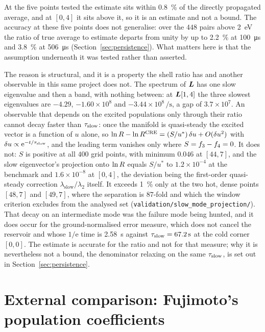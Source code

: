 At the five points tested the estimate sits within \SI{0.8}{\percent} of the
directly propagated average, and at $[0,4]$ it sits above it, so it is an
estimate and not a bound. The accuracy at these five points does not
generalise: over the $448$ pairs above \SI{2}{\electronvolt} the ratio of true
average to estimate departs from unity by up to \SI{2.2}{\percent} at
\SI{100}{\micro\second} and \SI{3.8}{\percent} at \SI{506}{\micro\second}
(Section~\ref{sec:persistence}). What matters here is that the assumption
underneath it was tested rather than asserted.

The reason is structural, and it is a property the shell ratio has and another
observable in this same project does not. The spectrum of $\bm{L}$ has one slow
eigenvalue and then a band, with nothing between: at $\bm{L}[1,4]$ the three
slowest eigenvalues are $-4.29$, $-1.60\times10^{8}$ and
$-3.44\times10^{8}\,\si{\per\second}$, a gap of $3.7\times10^{7}$. An observable
that depends on the excited populations only through their ratio cannot decay
faster than $\tau_{\mathrm{slow}}$: once the manifold is quasi-steady the excited vector is
a function of $u$ alone, so
$\ln R - \ln R^{\mathrm{CRE}} = (S/u^{*})\,\delta u + O(\delta u^{2})$
with $\delta u \propto \mathrm{e}^{-t/\tau_{\mathrm{slow}}}$, and the leading term
vanishes only where $S = f_{3}-f_{4} = 0$. It does not: $S$ is positive
at all $400$ grid points, with minimum $0.046$ at $[44,7]$, and the slow
eigenvector's projection onto $\ln R$ equals $S/u^{*}$ to
$1.2\times10^{-4}$ at the benchmark and $1.6\times10^{-8}$ at $[0,4]$, the
deviation being the first-order quasi-steady correction
$\lambda_{\mathrm{slow}}/\lambda_{2}$ itself. It exceeds \SI{1}{\percent} only
at the two hot, dense points $[48,7]$ and $[49,7]$, where the separation is
$87$-fold and which the window criterion excludes from the analysed set
(\texttt{validation/slow\_mode\_projection/}). That decay on an intermediate
mode was the failure mode being hunted, and it does occur for the
ground-normalised error measure, which does not cancel the reservoir and whose
$1/\mathrm{e}$ time is \SI{2.58}{\second} against
$\tau_{\mathrm{slow}} = \SI{67.2}{\second}$ at the cold corner $[0,0]$. The estimate is
accurate for the ratio and not for that measure; why it is nevertheless not a
bound, the denominator relaxing on the same $\tau_{\mathrm{slow}}$, is set out in
Section~\ref{sec:persistence}.

\section{External comparison: Fujimoto's population coefficients}
\label{sec:fujimoto}

